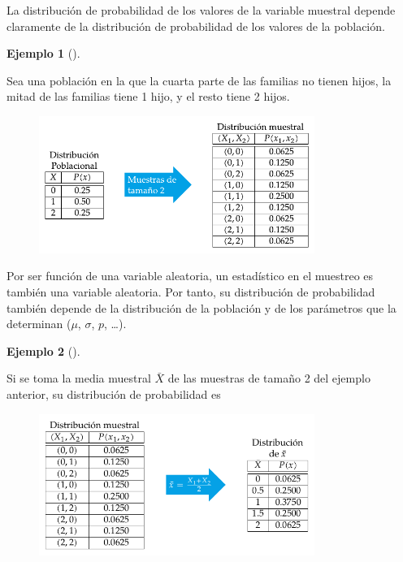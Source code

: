 \documentclass[
  a4paper,
]{scrreport}
\theoremstyle{definition}
\theoremstyle{definition}
\newtheorem{example}{Ejemplo}[chapter]
\theoremstyle{plain}
\theoremstyle{remark}
\begin{document}
La distribución de probabilidad de los valores de la variable muestral
depende claramente de la distribución de probabilidad de los valores de
la población.

\begin{example}[]\protect\hypertarget{exm-distribucion-muestral}{}\label{exm-distribucion-muestral}

Sea una población en la que la cuarta parte de las familias no tienen
hijos, la mitad de las familias tiene 1 hijo, y el resto tiene 2 hijos.

\begin{figure}

{\centering \includegraphics[width=0.8\textwidth,height=\textheight]{img/estimacion/distribucion-variable-muestral.pdf}

}

\end{figure}

\end{example}

Por ser función de una variable aleatoria, un estadístico en el muestreo
es también una variable aleatoria. Por tanto, su distribución de
probabilidad también depende de la distribución de la población y de los
parámetros que la determinan (\(\mu\), \(\sigma\), \(p\), \ldots).

\begin{example}[]\protect\hypertarget{exm-distribucion-media-muestral}{}\label{exm-distribucion-media-muestral}

Si se toma la media muestral \(\bar X\) de las muestras de tamaño 2 del
ejemplo anterior, su distribución de probabilidad es

\begin{figure}

{\centering \includegraphics[width=0.8\textwidth,height=\textheight]{img/estimacion/distribucion-media.pdf}

}

\end{figure}

\end{example}
\end{document}
